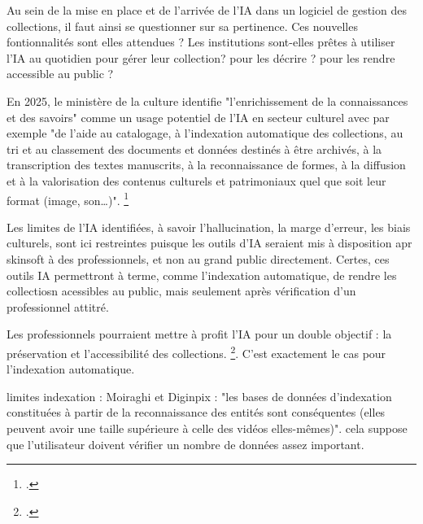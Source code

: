 \begin{itemize}
Au sein de la mise en place et de l'arrivée de l'IA dans un logiciel de gestion des collections, il faut ainsi se questionner sur sa pertinence. Ces nouvelles fontionnalités sont elles attendues ? Les institutions sont-elles prêtes à utiliser l'IA au quotidien pour gérer leur collection? pour les décrire ? pour les rendre accessible au public ?

En 2025, le ministère de la culture identifie "l'enrichissement de la connaissances et des savoirs" comme un usage potentiel de l'IA en secteur culturel avec par exemple "de l’aide au catalogage, à l’indexation automatique des collections, au tri et au classement des
documents et données destinés à être archivés, à la transcription des textes manuscrits, à la reconnaissance de formes, à la diffusion et à la valorisation des contenus culturels et patrimoniaux quel que soit leur
format (image, son…)". \footcite{2025a}

Les limites de l'IA identifiées, à savoir l'hallucination, la marge d'erreur, les biais culturels, sont ici restreintes puisque les outils d'IA seraient mis à disposition apr skinsoft à des professionnels, et non au grand public directement. Certes, ces outils IA permettront à terme, comme l'indexation automatique, de rendre les collectiosn acessibles au public, mais seulement après vérification d'un professionnel attitré. 

Les professionnels pourraient mettre à profit l'IA pour un double objectif : la préservation et l'accessibilité des collections. \footcite{zotero-item-640}. C'est exactement le cas pour l'indexation automatique. 

limites indexation : 
Moiraghi et Diginpix : "les bases de données d'indexation constituées à partir de la reconnaissance des entités sont conséquentes (elles peuvent avoir une taille supérieure à celle des vidéos elles-mêmes)". cela suppose que l'utilisateur doivent vérifier un nombre de données assez important. 

\end{itemize}